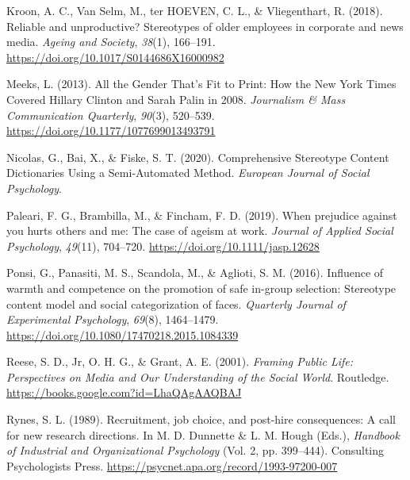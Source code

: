 \documentclass[
  12pt,
  letterpaper,
  DIV=11,
  numbers=noendperiod]{scrartcl}
\newlength{\cslhangindent}
\newlength{\cslentryspacingunit} %
\newenvironment{CSLReferences}[2] %
 {%
  \setlength{\parindent}{0pt}
  \ifodd #1
  \let\oldpar\par
  \def\par{\hangindent=\cslhangindent\oldpar}
  \fi
  \setlength{\parskip}{#2\cslentryspacingunit}
 }%
 {}
\begin{document}
\begin{CSLReferences}{1}{0}
\leavevmode{}%
Kroon, A. C., Van Selm, M., ter HOEVEN, C. L., \& Vliegenthart, R.
(2018). Reliable and unproductive? {Stereotypes} of older employees in
corporate and news media. \emph{Ageing and Society}, \emph{38}(1),
166--191. \url{https://doi.org/10.1017/S0144686X16000982}

\leavevmode{}%
Meeks, L. (2013). All the {Gender That}'s {Fit} to {Print}: {How} the
{New York Times Covered Hillary Clinton} and {Sarah Palin} in 2008.
\emph{Journalism \& Mass Communication Quarterly}, \emph{90}(3),
520--539. \url{https://doi.org/10.1177/1077699013493791}

\leavevmode{}%
Nicolas, G., Bai, X., \& Fiske, S. T. (2020). Comprehensive {Stereotype
Content Dictionaries Using} a {Semi}‐{Automated Method}. \emph{European
Journal of Social Psychology}.

\leavevmode{}%
Paleari, F. G., Brambilla, M., \& Fincham, F. D. (2019). When prejudice
against you hurts others and me: {The} case of ageism at work.
\emph{Journal of Applied Social Psychology}, \emph{49}(11), 704--720.
\url{https://doi.org/10.1111/jasp.12628}

\leavevmode{}%
Ponsi, G., Panasiti, M. S., Scandola, M., \& Aglioti, S. M. (2016).
Influence of warmth and competence on the promotion of safe in-group
selection: {Stereotype} content model and social categorization of
faces. \emph{Quarterly Journal of Experimental Psychology},
\emph{69}(8), 1464--1479.
\url{https://doi.org/10.1080/17470218.2015.1084339}

\leavevmode{}%
Reese, S. D., Jr, O. H. G., \& Grant, A. E. (2001). \emph{Framing
{Public Life}: {Perspectives} on {Media} and {Our Understanding} of the
{Social World}}. {Routledge}.
\url{https://books.google.com?id=LhaQAgAAQBAJ}

\leavevmode{}%
Rynes, S. L. (1989). Recruitment, job choice, and post-hire
consequences: {A} call for new research directions. In M. D. Dunnette \&
L. M. Hough (Eds.), \emph{Handbook of {Industrial} and {Organizational
Psychology}} (Vol. 2, pp. 399--444). {Consulting Psychologists Press}.
\url{https://psycnet.apa.org/record/1993-97200-007}


\end{CSLReferences}
\end{document}
